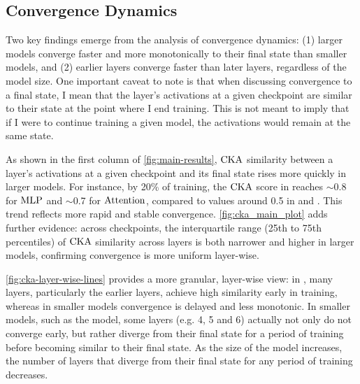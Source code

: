\subsection{Convergence Dynamics}
\label{subsec:convergence-dynamics}

Two key findings emerge from the analysis of convergence dynamics: (1) larger models converge faster and more monotonically to their final state than smaller models, and (2) earlier layers converge faster than later layers, regardless of the model size. One important caveat to note is that when discussing convergence to a final state, I mean that the layer's activations at a given checkpoint are similar to their state at the point where I end training. This is not meant to imply that if I were to continue training a given model, the activations would remain at the same state. 

\clearpage

\begin{result} 
\label{result:cka}
    
As shown in the first column of \cref{fig:main-results}, $\mathrm{CKA}$ similarity between a layer's activations at a given checkpoint and its final state rises more quickly in larger models. For instance, by 20\% of training, the $\mathrm{CKA}$ score in \twobil reaches $\sim$0.8 for $\mathrm{MLP}$ and $\sim$0.7 for $\mathrm{Attention}$, compared to values around 0.5 in \sevenmil and \sixmil. This trend reflects more rapid and stable convergence. \cref{fig:cka_main_plot} adds further evidence: across checkpoints, the interquartile range (25th to 75th percentiles) of $\mathrm{CKA}$ similarity across layers is both narrower and higher in larger models, confirming convergence is more uniform layer-wise.

\cref{fig:cka-layer-wise-lines} provides a more granular, layer-wise view: in \twobil, many layers, particularly the earlier layers, achieve high similarity early in training, whereas in smaller models convergence is delayed and less monotonic. In smaller models, such as the \sevenmil model, some layers (e.g. 4, 5 and 6) actually not only do not converge early, but rather diverge from their final state for a period of training before becoming similar to their final state. As the size of the model increases, the number of layers that diverge from their final state for any period of training decreases.

\end{result}


